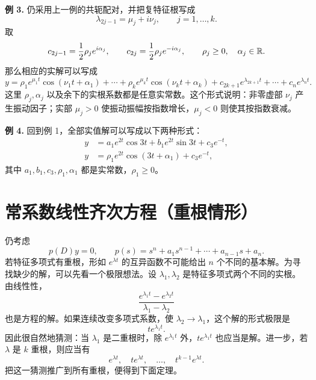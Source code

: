 \noindent\textbf{例 3.}
仍采用上一例的共轭配对，并把复特征根写成
\[
 \lambda_{2j-1}=\mu_j+i\nu_j,
 \qquad j=1,\ldots,k.
\]
取
\begin{equation}
 c_{2j-1}=\frac12\rho_je^{i\alpha_j},
 \qquad
 c_{2j}=\frac12\rho_je^{-i\alpha_j},
 \qquad \rho_j\ge0,\quad \alpha_j\in\mathbb R.
 \label{eq:ch2-7-example3-polar-constants}
\end{equation}
那么相应的实解可以写成
\begin{equation}
 y=\rho_1e^{\mu_1t}\cos(\nu_1t+\alpha_1)+\cdots
   +\rho_ke^{\mu_kt}\cos(\nu_kt+\alpha_k)
   +c_{2k+1}e^{\lambda_{2k+1}t}+\cdots+c_ne^{\lambda_nt}.
 \label{eq:ch2-7-example3-real-solution}
\end{equation}
这里 \(\rho_j,\alpha_j\) 以及余下的实根系数都是任意实常数。这个形式说明：非零虚部 \(\nu_j\) 产生振动因子；实部 \(\mu_j>0\) 使振动振幅按指数增长，\(\mu_j<0\) 则使其按指数衰减。

\noindent\textbf{例 4.}
回到例 1，全部实值解可以写成以下两种形式：
\begin{align}
 y&=a_1e^{2t}\cos3t+b_1e^{2t}\sin3t+c_3e^{-t},
 \label{eq:ch2-7-example4-rectangular}\\
 y&=\rho_1e^{2t}\cos(3t+\alpha_1)+c_3e^{-t},
 \label{eq:ch2-7-example4-polar}
\end{align}
其中 \(a_1,b_1,c_3,\rho_1,\alpha_1\) 都是实常数，\(\rho_1\ge0\)。

\section{常系数线性齐次方程（重根情形）}

仍考虑
\begin{equation}
 p(D)y=0,
 \qquad
 p(s)=s^n+a_1s^{n-1}+\cdots+a_{n-1}s+a_n.
 \label{eq:ch2-8-equation}
\end{equation}
若特征多项式有重根，形如 \(e^{\lambda t}\) 的互异函数不可能给出 \(n\) 个不同的基本解。为寻找缺少的解，可以先看一个极限想法。设 \(\lambda_1,\lambda_2\) 是特征多项式两个不同的实根。由线性性，
\begin{equation}
 \frac{e^{\lambda_1t}-e^{\lambda_2t}}{\lambda_1-\lambda_2}
 \label{eq:ch2-8-divided-difference}
\end{equation}
也是方程的解。如果连续改变多项式系数，使 \(\lambda_2\to\lambda_1\)，这个解的形式极限是
\[
 te^{\lambda_1t}.
\]
因此很自然地猜测：当 \(\lambda_1\) 是二重根时，除 \(e^{\lambda_1t}\) 外，\(te^{\lambda_1t}\) 也应当是解。进一步，若 \(\lambda\) 是 \(k\) 重根，则应当有
\[
 e^{\lambda t},\quad te^{\lambda t},\quad\ldots,\quad
 t^{k-1}e^{\lambda t}.
\]
把这一猜测推广到所有重根，便得到下面定理。

